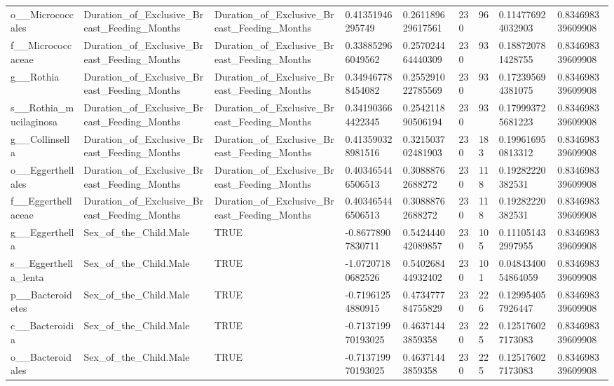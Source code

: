 \begin{longtable}{lllllllll}
o\_\_Micrococcales & Duration\_of\_Exclusive\_Breast\_Feeding\_Months & Duration\_of\_Exclusive\_Breast\_Feeding\_Months & 0.41351946295749 & 0.261189629617561 & 230 & 96 & 0.114776924032903 & 0.834698339609908 \\
f\_\_Micrococcaceae & Duration\_of\_Exclusive\_Breast\_Feeding\_Months & Duration\_of\_Exclusive\_Breast\_Feeding\_Months & 0.338852966049562 & 0.257024464440309 & 230 & 93 & 0.188720781428755 & 0.834698339609908 \\
g\_\_Rothia & Duration\_of\_Exclusive\_Breast\_Feeding\_Months & Duration\_of\_Exclusive\_Breast\_Feeding\_Months & 0.349467788454082 & 0.255291022785569 & 230 & 93 & 0.172395694381075 & 0.834698339609908 \\
s\_\_Rothia\_mucilaginosa & Duration\_of\_Exclusive\_Breast\_Feeding\_Months & Duration\_of\_Exclusive\_Breast\_Feeding\_Months & 0.341903664422345 & 0.254211890506194 & 230 & 93 & 0.179993725681223 & 0.834698339609908 \\
g\_\_Collinsella & Duration\_of\_Exclusive\_Breast\_Feeding\_Months & Duration\_of\_Exclusive\_Breast\_Feeding\_Months & 0.413590328981516 & 0.321503702481903 & 230 & 183 & 0.199616950813312 & 0.834698339609908 \\
o\_\_Eggerthellales & Duration\_of\_Exclusive\_Breast\_Feeding\_Months & Duration\_of\_Exclusive\_Breast\_Feeding\_Months & 0.403465446506513 & 0.30888762688272 & 230 & 118 & 0.19282220382531 & 0.834698339609908 \\
f\_\_Eggerthellaceae & Duration\_of\_Exclusive\_Breast\_Feeding\_Months & Duration\_of\_Exclusive\_Breast\_Feeding\_Months & 0.403465446506513 & 0.30888762688272 & 230 & 118 & 0.19282220382531 & 0.834698339609908 \\
g\_\_Eggerthella & Sex\_of\_the\_Child.Male & TRUE & -0.86778907830711 & 0.542444042089857 & 230 & 105 & 0.111051432997955 & 0.834698339609908 \\
s\_\_Eggerthella\_lenta & Sex\_of\_the\_Child.Male & TRUE & -1.07207180682526 & 0.540268444932402 & 230 & 101 & 0.0484340054864059 & 0.834698339609908 \\
p\_\_Bacteroidetes & Sex\_of\_the\_Child.Male & TRUE & -0.71961254880915 & 0.473477784755829 & 230 & 226 & 0.129954057926447 & 0.834698339609908 \\
c\_\_Bacteroidia & Sex\_of\_the\_Child.Male & TRUE & -0.713719970193025 & 0.46371443859358 & 230 & 225 & 0.125176027173083 & 0.834698339609908 \\
o\_\_Bacteroidales & Sex\_of\_the\_Child.Male & TRUE & -0.713719970193025 & 0.46371443859358 & 230 & 225 & 0.125176027173083 & 0.834698339609908 \\

\end{longtable}

